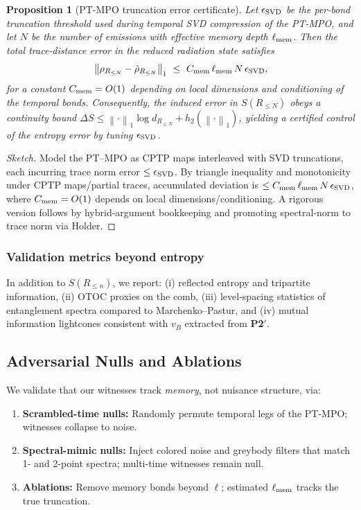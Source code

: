 \documentclass[aps,prd,preprint,onecolumn,superscriptaddress,nofootinbib,longbibliography,floatfix,11pt,showpacs,showkeys]{revtex4-2}
\newcommand{\PtwoPrime}{\textbf{P2$'$}\xspace}
\newcommand{\ellmem}{\ensuremath{\ell_{\mathrm{mem}}}}
\theoremstyle{plain}
\newtheorem{proposition}[theorem]{Proposition}
\theoremstyle{definition}
\theoremstyle{remark}
\begin{document}
\begin{proposition}[PT-MPO truncation error certificate]\label{prop:error}
Let $\epsilon_{\rm SVD}$ be the per-bond truncation threshold used during temporal SVD compression of the PT-MPO, and let $N$ be the number of emissions with effective memory depth $\ell_{\rm mem}$. Then the total trace-distance error in the reduced radiation state satisfies
\[
\left\|\rho_{R_{\le N}} - \tilde{\rho}_{R_{\le N}}\right\|_1 \ \le\ C_{\rm mem}\, \ell_{\rm mem}\, N\, \epsilon_{\rm SVD},
\]
for a constant $C_{\rm mem}=O(1)$ depending on local dimensions and conditioning of the temporal bonds. Consequently, the induced error in $S(R_{\le N})$ obeys a continuity bound $\Delta S \le \left\|\cdot\right\|_1 \log d_{R_{\le N}}+h_2(\left\|\cdot\right\|_1)$, yielding a certified control of the entropy error by tuning $\epsilon_{\rm SVD}$.
\end{proposition}
\begin{proof}[Sketch]
Model the PT--MPO as CPTP maps interleaved with SVD truncations, each incurring trace norm error $\le \epsilon_{\rm SVD}$. By triangle inequality and monotonicity under CPTP maps/partial traces, accumulated deviation is $\le C_{\rm mem}\,\ellmem\,N\,\epsilon_{\rm SVD}$, where $C_{\rm mem}=O(1)$ depends on local dimensions/conditioning. A rigorous version follows by hybrid-argument bookkeeping and promoting spectral-norm to trace norm via Holder.
\end{proof}

\subsubsection{Validation metrics beyond entropy}
In addition to $S(R_{\le n})$, we report: (i) reflected entropy and tripartite information, (ii) OTOC proxies on the comb, (iii) level-spacing statistics of entanglement spectra compared to Marchenko--Pastur, and (iv) mutual information lightcones consistent with $v_B$ extracted from \PtwoPrime.

\subsection{Adversarial Nulls and Ablations}
\label{subsec:adversarial}
We validate that our witnesses track \emph{memory}, not nuisance structure, via:
\begin{enumerate}[leftmargin=*,label=(\roman*)]
\item \textbf{Scrambled-time nulls:} Randomly permute temporal legs of the PT-MPO; witnesses collapse to noise.
\item \textbf{Spectral-mimic nulls:} Inject colored noise and greybody filters that match 1- and 2-point spectra; multi-time witnesses remain null.
\item \textbf{Ablations:} Remove memory bonds beyond $\ell$; estimated $\ell_{\rm mem}$ tracks the true truncation.
\end{enumerate}
\end{document}
